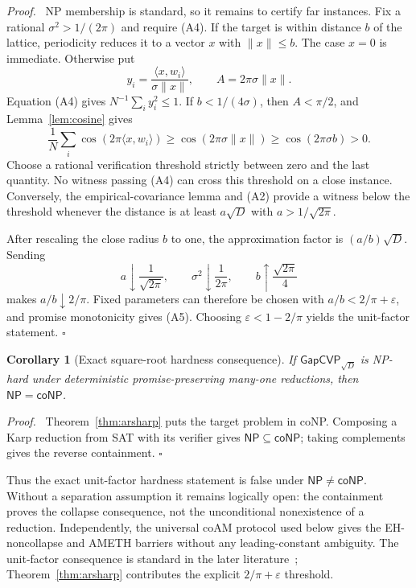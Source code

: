 \documentclass[11pt]{article}
\newtheorem{corollary}[theorem]{Corollary}
\newenvironment{proof}{\par\noindent\textit{Proof.}\ }{\hfill$\square$\par}
\newcommand{\GapCVP}{\mathsf{GapCVP}}
\begin{document}
\begin{proof}
NP membership is standard, so it remains to certify far instances.  Fix a
rational $\sigma^2>1/(2\pi)$ and require (A4).  If the target is
within distance $b$ of the lattice, periodicity reduces it to a vector $x$
with $\|x\|\le b$.  The case $x=0$ is immediate.  Otherwise put
\[
  y_i=\frac{\langle x,w_i\rangle}{\sigma\|x\|},
  \qquad A=2\pi\sigma\|x\|.
\]
Equation (A4) gives $N^{-1}\sum_i y_i^2\le1$.  If
$b<1/(4\sigma)$, then $A<\pi/2$, and Lemma~\ref{lem:cosine} gives
\[
  \frac1N\sum_i\cos(2\pi\langle x,w_i\rangle)
    \ge\cos(2\pi\sigma\|x\|)
    \ge\cos(2\pi\sigma b)>0.                            \tag{A6}
\]
Choose a rational verification threshold strictly between zero and the last
quantity.  No witness passing (A4) can cross this threshold on a close
instance.  Conversely, the empirical-covariance lemma and (A2) provide a
witness below the threshold whenever the distance is at least $a\sqrt D$
with $a>1/\sqrt{2\pi}$.

After rescaling the close radius $b$ to one, the approximation factor is
$(a/b)\sqrt D$.  Sending
\[
  a\downarrow\frac1{\sqrt{2\pi}},\qquad
  \sigma^2\downarrow\frac1{2\pi},\qquad
  b\uparrow\frac{\sqrt{2\pi}}4
\]
makes $a/b\downarrow2/\pi$.  Fixed parameters can therefore be chosen with
$a/b<2/\pi+\varepsilon$, and promise monotonicity gives (A5).  Choosing
$\varepsilon<1-2/\pi$ yields the unit-factor statement.
\end{proof}

\begin{corollary}[Exact square-root hardness consequence]
\label{cor:npconp}
If $\GapCVP_{\sqrt D}$ is NP-hard under deterministic promise-preserving
many-one reductions, then $\mathsf{NP}=\mathsf{coNP}$.
\end{corollary}

\begin{proof}
Theorem~\ref{thm:arsharp} puts the target problem in coNP.  Composing a Karp
reduction from SAT with its verifier gives $\mathsf{NP}\subseteq\mathsf{coNP}$;
taking complements gives the reverse containment.
\end{proof}

Thus the exact unit-factor hardness statement is false under
$\mathsf{NP}\ne\mathsf{coNP}$.  Without a separation assumption it remains
logically open: the containment proves the collapse consequence, not the
unconditional nonexistence of a reduction.  Independently, the universal
coAM protocol used below gives the EH-noncollapse and AMETH barriers without
any leading-constant ambiguity.  The unit-factor consequence is standard in
the later literature~\cite{ABBGKLPV22}; Theorem~\ref{thm:arsharp} contributes
the explicit $2/\pi+\varepsilon$ threshold.
\end{document}
